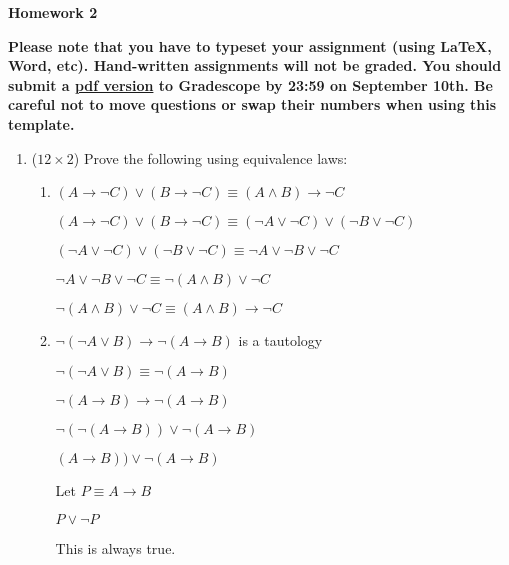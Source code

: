 \documentclass[12pt]{article}
\date{}
\begin{document}
\begin{flushleft}
\large \bf
Homework 2 \\
\end{flushleft}
{\bf
Please note that you have to typeset your assignment (using \LaTeX, Word, etc).
Hand-written assignments will not be graded.
You should submit a \underline{pdf version} to Gradescope by 23:59 on September 10th. Be careful not to move questions or swap their numbers when using this template.
}

\begin{enumerate}

\item ($12 \times 2$)
Prove the following using equivalence laws:

\begin{enumerate}
\item
$(A \to \lnot C) \lor (B \to \lnot C) \equiv (A \land B) \to \lnot C$

$(A \to \lnot C) \lor (B \to \lnot C) \equiv (\lnot A \lor \lnot C) \lor (\lnot B \lor \lnot C)$

$(\lnot A \lor \lnot C) \lor (\lnot B \lor \lnot C) \equiv \lnot A \lor \lnot B \lor \lnot C$

$\lnot A \lor \lnot B \lor \lnot C \equiv \lnot(A \land B) \lor \lnot C$

$\lnot(A \land B) \lor \lnot C \equiv (A \land B) \to \lnot C$

\clearpage
\item
$\lnot (\lnot A \lor B) \to  \lnot (A \to B)$ is a tautology

$\lnot (\lnot A \lor B) \equiv \lnot (A \to B)$

$\lnot (A \to B) \to \lnot (A \to B)$

$\lnot(\lnot (A \to B)) \lor \lnot (A \to B)$

$ (A \to B)) \lor \lnot (A \to B)$

Let $P \equiv A \to B$

$P \lor \lnot P$

This is always true.

\clearpage
\end{enumerate}


\end{enumerate}
\end{document}
